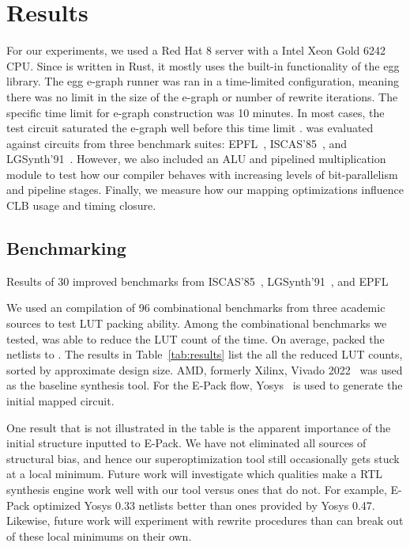 \section{Results}\label{sec:results}
For our experiments, we used a Red Hat 8 server with a Intel Xeon Gold 6242
CPU. Since \shortname{} is written in Rust, it mostly uses the built-in
functionality of the egg library. The egg e-graph runner was ran in a
time-limited configuration, meaning there was no limit in the size of the
e-graph or number of rewrite iterations. The specific time limit for e-graph
construction was 10 minutes. In most cases, the test circuit saturated the
e-graph well before this time limit .
\shortname{} was evaluated against circuits from three benchmark suites:
EPFL~\cite{epflbench}, ISCAS'85~\cite{iscasbench}, and
LGSynth'91~\cite{lgsynthbench}. However, we also included an ALU and pipelined
multiplication module to test how our compiler behaves with increasing levels
of bit-parallelism and pipeline stages. Finally, we measure how our mapping
optimizations influence CLB usage and timing closure.

\subsection{Benchmarking}\label{sec:results:benchmark}
\begin{table}
    \centering
    \caption{Results of 30 improved benchmarks from ISCAS'85~\cite{iscasbench}, LGSynth'91~\cite{lgsynthbench}, and EPFL~\cite{epflbench}}\label{tab:results}
\end{table}

We used an compilation of 96 combinational benchmarks from three academic
sources to test LUT packing ability. Among the combinational benchmarks we
tested, \shortname{} was able to reduce the LUT count \fmetric{} of the time.
On average, \shortname{} packed the netlists to \metric{}. The results in
Table~\ref{tab:results} list the all the reduced LUT counts, sorted by
approximate design size. AMD, formerly Xilinx, Vivado 2022~\cite{vivado} was
used as the baseline synthesis tool. For the E-Pack flow, Yosys~\cite{yosys} is
used to generate the initial mapped circuit. 

One result that is not illustrated in the table is the apparent importance of
the initial structure inputted to E-Pack. We have not eliminated all sources of
structural bias, and hence our superoptimization tool still occasionally gets
stuck at a local minimum. Future work will investigate which qualities make a
RTL synthesis engine work well with our tool versus ones that do not. For
example, E-Pack optimized Yosys 0.33 netlists better than ones provided by
Yosys 0.47. Likewise, future work will experiment with rewrite procedures than
can break out of these local minimums on their own.

